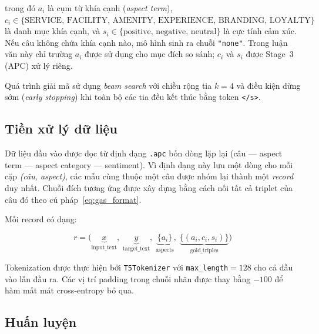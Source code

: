 \noindent trong đó $a_i$ là cụm từ khía cạnh (\textit{aspect term}),
$c_i \in \{\text{SERVICE, FACILITY, AMENITY, EXPERIENCE, BRANDING,
LOYALTY}\}$ là danh mục khía cạnh, và
$s_i \in \{\text{positive, negative, neutral}\}$ là cực tính cảm xúc.
Nếu câu không chứa khía cạnh nào, mô hình sinh ra chuỗi
\texttt{"none"}.  Trong luận văn này chỉ trường $a_i$ được sử dụng
cho mục đích so sánh; $c_i$ và $s_i$ được Stage~3 (APC) xử lý riêng.

Quá trình giải mã sử dụng \textit{beam search} với chiều rộng tia
$k = 4$ và điều kiện dừng sớm (\textit{early stopping}) khi toàn bộ
các tia đều kết thúc bằng token \texttt{</s>}.

\subsection{Tiền xử lý dữ liệu}
\label{subsec:gas_data}

Dữ liệu đầu vào được đọc từ định dạng \texttt{.apc} bốn dòng lặp lại
(câu — aspect term — aspect category — sentiment).
Vì định dạng này lưu một dòng cho mỗi cặp \textit{(câu, aspect)},
các mẫu cùng thuộc một câu được nhóm lại thành một
\textit{record} duy nhất.  Chuỗi đích tương ứng được xây dựng bằng
cách nối tất cả triplet của câu đó theo cú pháp~\eqref{eq:gas_format}.

Mỗi record có dạng:

\begin{equation}
  r = \bigl(\underbrace{x}_{\text{input\_text}},\;
            \underbrace{y}_{\text{target\_text}},\;
            \underbrace{\{a_i\}}_{\text{aspects}},\;
            \underbrace{\{(a_i, c_i, s_i)\}}_{\text{gold\_triples}}
      \bigr)
  \label{eq:gas_record}
\end{equation}

Tokenization được thực hiện bởi \texttt{T5Tokenizer} với
\texttt{max\_length}$= 128$ cho cả đầu vào lẫn đầu ra.  Các vị trí
padding trong chuỗi nhãn được thay bằng $-100$ để hàm mất mát
cross-entropy bỏ qua.

\subsection{Huấn luyện}
\label{subsec:gas_train}

